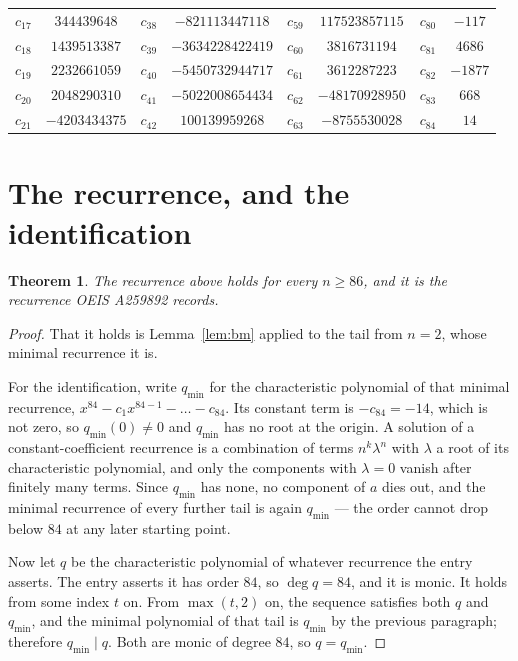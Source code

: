 \documentclass[11pt,a4paper]{article}
\theoremstyle{plain}
\newtheorem{theorem}{Theorem}
\theoremstyle{definition}
\begin{document}
\begin{center}
\begin{tabular}{cccccccc}
$c_{17}$ & $344439648$ & $c_{38}$ & $-821113447118$ & $c_{59}$ & $117523857115$ & $c_{80}$ & $-117$ \\
$c_{18}$ & $1439513387$ & $c_{39}$ & $-3634228422419$ & $c_{60}$ & $3816731194$ & $c_{81}$ & $4686$ \\
$c_{19}$ & $2232661059$ & $c_{40}$ & $-5450732944717$ & $c_{61}$ & $3612287223$ & $c_{82}$ & $-1877$ \\
$c_{20}$ & $2048290310$ & $c_{41}$ & $-5022008654434$ & $c_{62}$ & $-48170928950$ & $c_{83}$ & $668$ \\
$c_{21}$ & $-4203434375$ & $c_{42}$ & $100139959268$ & $c_{63}$ & $-8755530028$ & $c_{84}$ & $14$ \\
\end{tabular}
\end{center}

\section{The recurrence, and the identification}

\begin{theorem}
The recurrence above holds for every $n\ge86$, and it is the recurrence OEIS A259892 records.
\end{theorem}

\begin{proof}
That it holds is Lemma~\ref{lem:bm} applied to the tail from $n=2$, whose minimal
recurrence it is.

For the identification, write $q_{\min}$ for the characteristic polynomial of that minimal
recurrence, $x^{84}-c_1x^{84-1}-\dots-c_{84}$. Its constant term is
$-c_{84}=-14$, which is not zero, so $q_{\min}(0)\neq0$ and $q_{\min}$ has no
root at the origin. A solution of a constant-coefficient recurrence is a combination of terms
$n^{k}\lambda^{n}$ with $\lambda$ a root of its characteristic polynomial, and only the
components with $\lambda=0$ vanish after finitely many terms. Since $q_{\min}$ has none, no
component of $a$ dies out, and the minimal recurrence of every further tail is again
$q_{\min}$ --- the order cannot drop below $84$ at any later starting point.

Now let $q$ be the characteristic polynomial of whatever recurrence the entry asserts. The
entry asserts it has order $84$, so $\deg q=84$, and it is monic. It holds from some
index $t$ on. From $\max(t,2)$ on, the sequence satisfies both $q$ and $q_{\min}$, and
the minimal polynomial of that tail is $q_{\min}$ by the previous paragraph; therefore
$q_{\min}\mid q$. Both are monic of degree $84$, so $q=q_{\min}$.
\end{proof}
\end{document}
